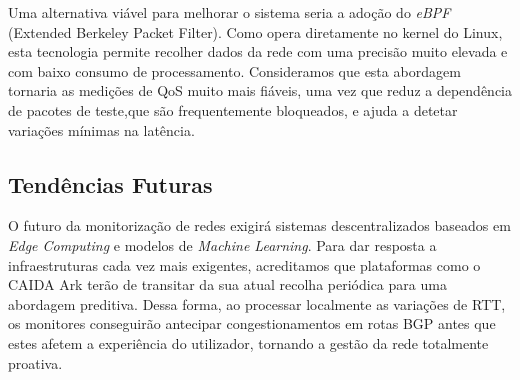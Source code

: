 \documentclass[11pt, a4paper]{article}
\begin{document}
Uma alternativa viável para melhorar o sistema seria a adoção do \textit{eBPF} (Extended Berkeley Packet Filter). Como opera diretamente no kernel do Linux, esta tecnologia permite recolher dados da rede com uma precisão muito elevada e com baixo consumo de processamento. Consideramos que esta abordagem tornaria as medições de QoS muito mais fiáveis, uma vez que reduz a dependência de pacotes de teste,que são frequentemente bloqueados, e ajuda a detetar variações mínimas na latência.

\subsection{Tendências Futuras}
O futuro da monitorização de redes exigirá sistemas descentralizados baseados em \textit{Edge Computing} e modelos de \textit{Machine Learning}. Para dar resposta a infraestruturas cada vez mais exigentes, acreditamos que plataformas como o CAIDA Ark terão de transitar da sua atual recolha periódica para uma abordagem preditiva. Dessa forma, ao processar localmente as variações de RTT, os monitores conseguirão antecipar congestionamentos em rotas BGP antes que estes afetem a experiência do utilizador, tornando a gestão da rede totalmente proativa.
\end{document}
